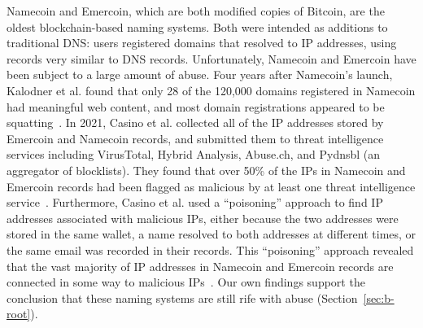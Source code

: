 Namecoin and Emercoin, which are both modified copies of Bitcoin, are 
the oldest blockchain-based naming systems. Both were 
intended as additions to traditional DNS: users registered domains that 
resolved to IP addresses, using records very similar to DNS 
records. Unfortunately, Namecoin and Emercoin have been subject to a large 
amount of abuse. Four years after Namecoin's launch, Kalodner et al. found that 
only 28 of the 120,000 domains registered in Namecoin had meaningful web 
content, and most domain registrations appeared to be 
squatting~\cite{kalodner_namecoin_2015}. 
In 2021, Casino et al. collected all of the IP addresses stored by Emercoin 
and Namecoin records, and submitted them to threat intelligence services 
including VirusTotal, Hybrid Analysis, Abuse.ch, and Pydnsbl (an aggregator of 
blocklists). They found that over 50\% of the IPs in Namecoin and Emercoin 
records had been flagged as malicious by at least one threat intelligence 
service~\cite{casino_unearthing_2021}. Furthermore, Casino et al. used a 
``poisoning'' approach to find IP addresses associated with malicious IPs, 
either because the two addresses were stored in the same 
wallet, a name resolved to both addresses at different times, 
or the same email was recorded in their records. This ``poisoning'' approach 
revealed that the vast majority of IP addresses in Namecoin and Emercoin 
records are connected in some way to malicious 
IPs~\cite{casino_unearthing_2021}. 
Our own findings support the conclusion that these naming 
systems are still rife with abuse (Section~\ref{sec:b-root}). 



